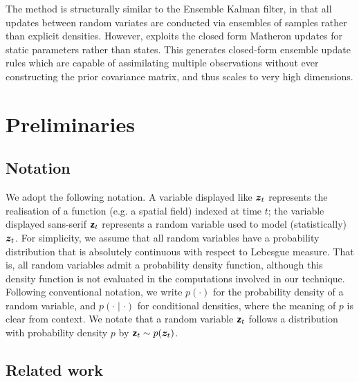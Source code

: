 \documentclass{article}
\theoremstyle{plain}
\theoremstyle{definition}
\theoremstyle{remark}
\begin{document}
The method is structurally similar to the Ensemble Kalman filter, in that all updates between random variates are conducted via ensembles of samples rather than explicit densities.
However, \meth{} exploits the closed form Matheron updates for static parameters rather than states. This generates closed-form ensemble update rules which are capable of assimilating multiple observations without ever constructing the prior covariance matrix, and thus scales to very high dimensions.

\section{Preliminaries}

\subsection{Notation}
We adopt the following notation. A variable displayed like $\boldsymbol{z}_{t}$ represents the realisation of a function (e.g. a spatial field) indexed at time $t$; the variable displayed sans-serif $\boldsymbol{\mathsf{z}}_{t}$ represents a random variable used to model (statistically) $\boldsymbol{z}_{t}$.
For simplicity, we assume that all random variables have a probability distribution that is absolutely continuous with respect to Lebesgue measure.
That is, all random variables admit a probability density function, although this density function is not evaluated in the computations involved in our technique.
Following conventional notation, we write $p(\cdot)$ for the probability density of a random variable, and $p(\cdot \mid \cdot)$ for conditional densities, where the meaning of $p$ is clear from context.
We notate that a random variable $\boldsymbol{\mathsf{z}}_t$ follows a distribution with probability density $p$ by $\boldsymbol{\mathsf{z}}_t \sim p(\boldsymbol{z}_t)$.

\subsection{Related work}
\end{document}
